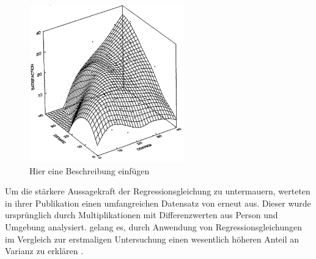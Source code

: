 \begin{figure}[h]
	\centering
	\includegraphics[width=0.6\textwidth]{gfx/drei_d_modell.png}
	\caption{Hier eine Beschreibung einfügen \cite[S. 57]{edwards:1991}}
	\label{fig:personEnvironmentFit:wichtigkeiten:abb2}
\end{figure}

Um die stärkere Aussagekraft der Regressionsgleichung zu untermauern, werteten \textcite[S. 18ff.]{edwards:1993b}  in ihrer Publikation einen umfangreichen Datensatz von \textcite[S. 9ff.]{mechanismsOfJobStressAndStrain:1982} erneut aus. Dieser wurde ursprünglich durch Multiplikationen mit Differenzwerten aus Person und Umgebung analysiert. \textcite[S. 18ff.]{edwards:1993b} gelang es, durch Anwendung von Regressionsgleichungen im Vergleich zur erstmaligen Untersuchung einen wesentlich höheren Anteil an Varianz zu erklären \cite[S. 8]{su:2015}.

